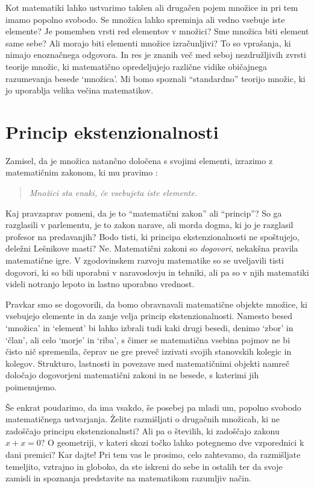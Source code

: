 Kot matematiki lahko ustvarimo takšen ali drugačen pojem množice in pri tem imamo popolno
svobodo. Se množica lahko spreminja ali vedno vsebuje iste elemente? Je pomemben vrsti red
elementov v množici? Sme množica biti element same sebe? Ali morajo biti elementi množice
izračunljivi? To so vprašanja, ki nimajo enoznačnega odgovora. In res je znanih več med
seboj nezdružljivih zvrsti teorije množic, ki matematično opredeljujejo različne vidike
običajnega razumevanja besede `množica'. Mi bomo spoznali ``standardno'' teorijo množic,
ki jo uporablja velika večina matematikov.


\section{Princip ekstenzionalnosti}
\label{sec:princip-ekstenzionalnosti}

Zamisel, da je množica natančno določena s svojimi elementi, izrazimo z matematičnim
zakonom, ki mu pravimo :
%
\begin{quote}
  \emph{Množici sta enaki, če vsebujeta iste elemente.}
\end{quote}
%
Kaj pravzaprav pomeni, da je to ``matematični zakon'' ali ``princip''? So ga razglasili v
parlementu, je to zakon narave, ali morda dogma, ki jo je razglasil profesor na
predavanjih? Bodo tisti, ki principa ekstenzionalnosti ne spoštujejo, deležni Lešnikove
masti? Ne. Matematični zakoni so \emph{dogovori}, nekakšna pravila matematične igre. V
zgodovinskem razvoju matematike so se uveljavili tisti dogovori, ki so bili uporabni v
naravoslovju in tehniki, ali pa so v njih matematiki videli notranjo lepoto in lastno
uporabno vrednost.

Pravkar smo se dogovorili, da bomo obravnavali matematične objekte množice, ki vsebujejo
elemente in da zanje velja princip ekstenzionalnosti. Namesto besed `množica' in `element'
bi lahko izbrali tudi kaki drugi besedi, denimo `zbor' in `član', ali celo `morje' in
`riba', s čimer se matematična vsebina pojmov ne bi čisto nič spremenila, čeprav ne gre
preveč izzivati svojih stanovskih kolegic in kolegov. Strukturo, lastnosti in povezave med
matematičnimi objekti namreč določajo dogovorjeni matematični zakoni in ne besede, s
katerimi jih poimenujemo.

Še enkrat poudarimo, da ima vsakdo, še posebej pa mladi um, popolno svobodo matematičnega
ustvarjanja. Želite razmišljati o drugačnih množicah, ki ne zadoščajo principu
ekstenzionalnsti? Ali pa o številih, ki zadoščajo zakonu $x + x = 0$? O geometriji, v
kateri skozi točko lahko potegnemo dve vzporednici k dani premici? Kar dajte! Pri tem vas
le prosimo, celo zahtevamo, da razmišljate temeljito, vztrajno in globoko, da ste iskreni
do sebe in ostalih ter da svoje zamisli in spoznanja predstavite na matematikom razumljiv
način.

